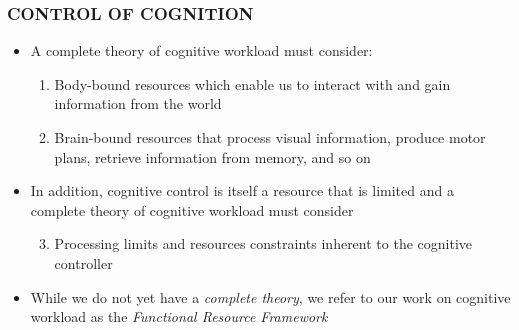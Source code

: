 \documentclass{beamer}
\begin{document}
\begin{frame}
	\frametitle{CONTROL OF COGNITION}
	\begin{itemize}
		\item A complete theory of cognitive workload must consider: 
		\begin{enumerate}
			\item Body-bound resources which enable us to interact with and gain information from the world
			\item Brain-bound resources that process visual information, produce motor plans, retrieve information from memory, and so on
		\end{enumerate}
		\pause
		\item In addition, cognitive control is itself a resource that is limited and a complete theory of cognitive workload must consider
		\begin{enumerate}
			\setcounter{enumi}{2}
			\item Processing limits and resources constraints inherent to the cognitive controller
		\end{enumerate}
		\pause
		\item While we do not yet have a \emph{complete theory}, we refer to our work on cognitive workload as the \emph{Functional Resource Framework}
	\end{itemize}

\end{frame}

\end{document}
